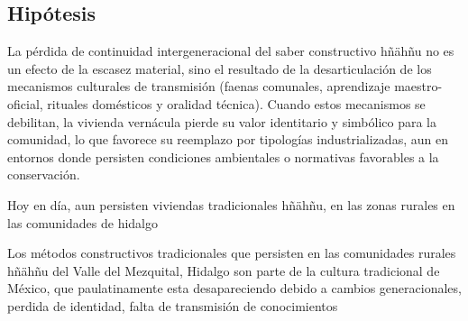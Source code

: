\subsection{Hipótesis}

La pérdida de continuidad intergeneracional del saber constructivo hñähñu no es un efecto de la escasez material, sino el resultado de la desarticulación de los mecanismos culturales de transmisión (faenas comunales, aprendizaje maestro-oficial, rituales domésticos y oralidad técnica).  Cuando estos mecanismos se debilitan, la vivienda vernácula pierde su valor identitario y simbólico para la comunidad, lo que favorece su reemplazo por tipologías industrializadas, aun en entornos donde persisten condiciones ambientales o normativas favorables a la conservación.

Hoy en día, aun persisten viviendas tradicionales hñähñu, en las zonas rurales en las comunidades de hidalgo

Los métodos constructivos tradicionales que persisten en las comunidades rurales hñähñu del Valle del Mezquital, Hidalgo son parte de la cultura tradicional de México, que paulatinamente esta desapareciendo debido a cambios generacionales, perdida de identidad, falta de transmisión de conocimientos
